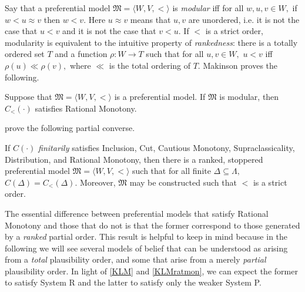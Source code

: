 Say that a preferential model $\mathfrak{M} = \langle W,V, < \rangle$ is {\em
modular} iff for all $w,u,v \in W,$ if $w< u \approx v$ then $w< v.$ Here
$u\approx v$ means that $u,v$ are unordered, i.e. it is not the case that $u<v$
and it is not the case that $v<u$. If $<$ is a strict order, modularity is
equivalent to the intuitive property of {\em rankedness}: there is a totally
ordered set $T$ and a function $\rho : W \rightarrow T$ such that for all
$u,v\in W,$ $u<v$ iff $\rho(u)\ll\rho(v),$ where $\ll$ is the total ordering of
$T$. Makinson proves the following.
\begin{theorem}
Suppose that $\mathfrak{M} = \langle W,V, <\rangle$ is a preferential model. If
$\mathfrak{M}$ is modular, then $C_<(\cdot)$ satisfies Rational Monotony.
\end{theorem}
\citet{kraus1990nonmonotonic} prove the following partial converse.
\begin{theorem}\label{KLMratmon}
If $C(\cdot)$  {\em finitarily} satisfies Inclusion, Cut, Cautious Monotony,
Supraclassicality, Distribution, and Rational Monotony, then there is a ranked,
stoppered preferential model $\mathfrak{M} = \langle W,V, <\rangle$ such that
for all finite $\Delta \subseteq \Lambda,$ $C(\Delta)=C_<(\Delta).$ Moreover,
$\mathfrak{M}$ may be constructed such that $<$ is a strict order.  
\end{theorem}
The essential difference between preferential models that satisfy Rational
Monotony and those that do not is that the former correspond to those generated
by a {\em ranked} partial order. This result is helpful to keep in mind because
in the following we will see several models of belief that can be understood as
arising from a {\em total} plausibility order, and some that arise from a merely
{\em partial} plausibility order. In light of \autoref{KLM} and
\autoref{KLMratmon}, we can expect the former to satisfy System R and the latter
to satisfy only the weaker System P. 





